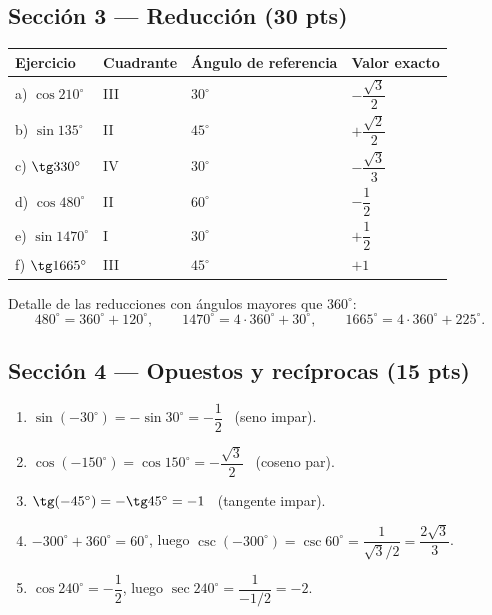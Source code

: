 \documentclass[12pt, letterpaper]{article}
\providecommand{\sen}{\sin}
\begin{document}
\subsection*{Sección 3 — Reducción (30 pts)}
\begin{center}
\renewcommand{\arraystretch}{1.7}
\setlength{\tabcolsep}{9pt}
\begin{tabular}{@{}llll@{}}
  \toprule
  \textbf{Ejercicio} & \textbf{Cuadrante} & \textbf{Ángulo de referencia} & \textbf{Valor exacto} \\
  \midrule
  a) $\cos 210^\circ$  & III & $30^\circ$ & $-\dfrac{\sqrt{3}}{2}$ \\
  b) $\sen 135^\circ$  & II  & $45^\circ$ & $+\dfrac{\sqrt{2}}{2}$ \\
  c) $\tg 330^\circ$   & IV  & $30^\circ$ & $-\dfrac{\sqrt{3}}{3}$ \\
  d) $\cos 480^\circ$  & II  & $60^\circ$ & $-\dfrac12$ \\
  e) $\sen 1470^\circ$ & I   & $30^\circ$ & $+\dfrac12$ \\
  f) $\tg 1665^\circ$  & III & $45^\circ$ & $+1$ \\
  \bottomrule
\end{tabular}
\end{center}

\noindent Detalle de las reducciones con ángulos mayores que $360^\circ$:
\[
  480^\circ=360^\circ+120^\circ,\qquad
  1470^\circ=4\cdot360^\circ+30^\circ,\qquad
  1665^\circ=4\cdot360^\circ+225^\circ.
\]

\subsection*{Sección 4 — Opuestos y recíprocas (15 pts)}
\begin{enumerate}[leftmargin=*, label=\textbf{\alph*)}]
  \item $\sen(-30^\circ)=-\sen30^\circ=-\dfrac12$ \ (seno impar).
  \item $\cos(-150^\circ)=\cos150^\circ=-\dfrac{\sqrt{3}}{2}$ \ (coseno par).
  \item $\tg(-45^\circ)=-\tg45^\circ=-1$ \ (tangente impar).
  \item $-300^\circ+360^\circ=60^\circ$, luego
        $\csc(-300^\circ)=\csc60^\circ=\dfrac{1}{\sqrt{3}/2}
        =\dfrac{2\sqrt{3}}{3}$.
  \item $\cos240^\circ=-\dfrac12$, luego
        $\sec240^\circ=\dfrac{1}{-1/2}=-2$.
\end{enumerate}
\end{document}
